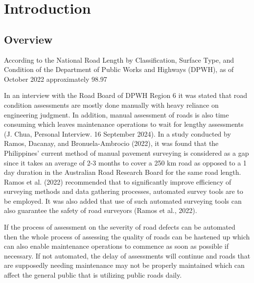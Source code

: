 \chapter{Introduction}
\label{sec:researchdesc}    %

\section{Overview}
\label{sec:overview}
According to the National Road Length by Classification, Surface Type, and Condition of the Department of Public Works and Highways (DPWH), as of October 2022 approximately 98.97%


In an interview with the Road Board of DPWH Region 6 it was stated that road condition assessments are mostly done manually with heavy reliance on engineering judgment. In addition, manual assessment of roads is also time consuming which leaves maintenance operations to wait for lengthy assessments (J. Chua, Personal Interview. 16 September 2024).  In a study conducted by Ramos, Dacanay, and Bronuela-Ambrocio (2022), it was found that the Philippines’ current method of manual pavement surveying is considered as a gap since it takes an average of 2-3 months to cover a 250 km road as opposed to a 1 day duration in the Australian Road Research Board for the same road length. Ramos et al. (2022) recommended that to significantly improve efficiency of surveying methods and data gathering processes, automated survey tools are to be employed. It was also added that use of such automated surveying tools can also guarantee the safety of road surveyors (Ramos et al., 2022).


If the process of assessment on the severity of road defects can be automated then the whole process of assessing the quality of roads can be hastened up which can also enable maintenance operations to commence as soon as possible if necessary. If not automated, the delay of assessments will continue and roads that are supposedly needing maintenance may not be properly maintained which can affect the general public that is utilizing public roads daily.


